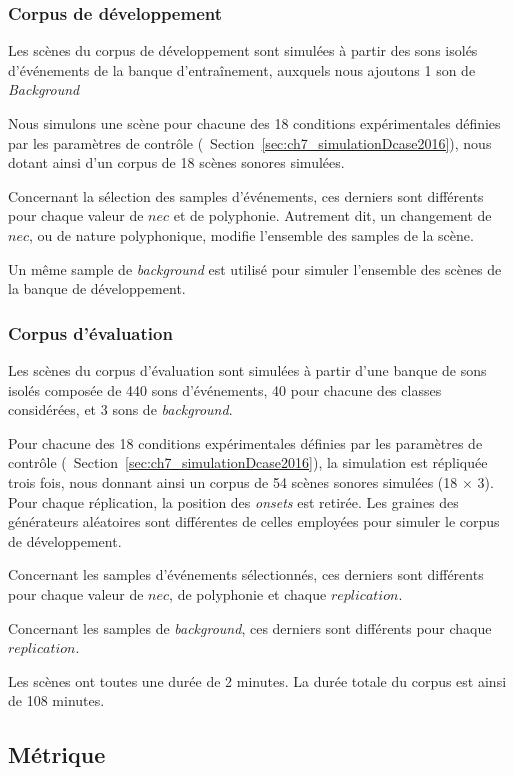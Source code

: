 \subsubsection{Corpus de développement}

Les scènes du corpus de développement sont simulées à partir des sons isolés d'événements de la banque d’entraînement, auxquels nous ajoutons 1 son de \emph{Background}

Nous simulons une scène pour chacune des 18 conditions expérimentales définies par les paramètres de contrôle (\cf~Section~\ref{sec:ch7_simulationDcase2016}), nous dotant ainsi d'un corpus de 18 scènes sonores simulées.

Concernant la sélection des samples d'événements, ces derniers sont différents pour chaque valeur de $nec$ et de polyphonie. Autrement dit, un changement de $nec$, ou de nature polyphonique, modifie l'ensemble des samples de la scène. 

Un même sample de \emph{background} est utilisé pour simuler l'ensemble des scènes de la banque de développement.

\subsubsection{Corpus d'évaluation}

Les scènes du corpus d'évaluation sont simulées à partir d'une banque de sons isolés composée de 440 sons d'événements, 40 pour chacune des classes considérées, et 3 sons de \emph{background}.

Pour chacune des 18 conditions expérimentales définies par les paramètres de contrôle (\cf~Section~\ref{sec:ch7_simulationDcase2016}), la simulation est répliquée trois fois, nous donnant ainsi un corpus de 54 scènes sonores simulées (18 $\times$ 3). Pour chaque réplication, la position des \emph{onsets} est retirée. Les graines des générateurs aléatoires sont différentes de celles employées pour simuler le corpus de développement.

Concernant les samples d'événements sélectionnés, ces derniers sont différents pour chaque valeur de $nec$, de polyphonie et chaque $replication$. 
 
Concernant les samples de \emph{background}, ces derniers sont différents pour chaque $replication$. 

Les scènes ont toutes une durée de 2 minutes. La durée totale du corpus est ainsi de 108 minutes.

\subsection{Métrique}


